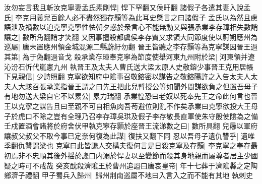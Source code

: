 汝勿妄言我且斬汝克寧妻孟氏素剛悍|{
	悍下罕翻又侯旰翻}
諸假子各遣其妻入說孟氏|{
	李克用義兒百餘人必不盡然獨存顥等為此耳史槩言之曰諸假子}
孟氏以為然且慮語泄及禍數以迫克寧克寧性怯朝夕惑於衆言心不能無動又與張承業李存璋相失數誚讓之|{
	數所角翻誚才笑翻}
又因事擅殺都虞侯李存質又求領大同節度使以蔚朔應州為巡屬|{
	唐末置應州領金城混源二縣蔚紆勿翻}
晉王皆聽之李存顥等為克寧謀因晉王過其第|{
	為于偽翻過音戈}
殺承業存璋奉克寧為節度使舉河東九州附於梁|{
	河東領并遼沁汾石忻代嵐憲九州}
執晉王及太夫人曹氏送大梁太原人史敬鎔少事晉王克用居帳下見親信|{
	少詩照翻}
克寧欲知府中隂事召敬鎔密以謀告之敬鎔陽許之入告太夫人太夫人大駭召張承業指晉王謂之曰先王把此兒臂授公等如聞外間謀欲負之但置吾母子有地勿送大梁自它不以累公|{
	累力瑞翻}
承業惶恐曰老奴以死奉先王之命此何言也晉王以克寧之謀告且曰至親不可自相魚肉吾苟避位則亂不作矣承業曰克寧欲投大王母子於虎口不除之豈有全理乃召李存璋吳珙及假子李存敬長直軍使朱守殷使隂為之備壬戍置酒會諸將於府舍伏甲執克寧存顥於座晉王流涕數之曰|{
	數所具翻}
兒曏以軍府讓叔父叔父不取今事已定奈何復為此謀|{
	復扶又翻下同}
忍以吾母子遺仇讐乎|{
	遺唯季翻仇讐謂梁也}
克寧曰此皆讒人交構夫復何言是日殺克寧及存顥|{
	李克寧之奉存朂初焉非不忠順其後外揺於讒口内溺於悍妻以至變節而殺其身地親而屬尊者居主少國疑之時可不戒哉}
癸亥酖殺濟隂王於曹州追謚曰唐哀皇帝|{
	年十七葬于濟隂縣之定陶鄉濟子禮翻}
甲子蜀兵入歸州|{
	歸州荆南巡屬不地曰入言入之而不能有其地}
執刺史

